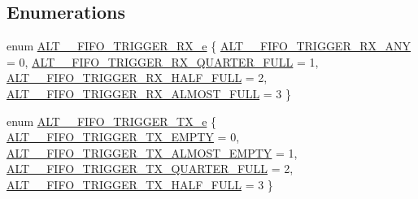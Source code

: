 \subsection*{Enumerations}
\begin{DoxyCompactItemize}
\item 
enum \mbox{\hyperlink{group__UART__FIFO_ga2bfcdb68fa8def11f82daafbdab9b32c}{A\+L\+T\+\_\+\_\+\+F\+I\+F\+O\+\_\+\+T\+R\+I\+G\+G\+E\+R\+\_\+\+R\+X\+\_\+e}} \{ \mbox{\hyperlink{group__UART__FIFO_gga2bfcdb68fa8def11f82daafbdab9b32cae4a6c3354a0b441adf2cea823435f773}{A\+L\+T\+\_\+\_\+\+F\+I\+F\+O\+\_\+\+T\+R\+I\+G\+G\+E\+R\+\_\+\+R\+X\+\_\+\+A\+NY}} = 0, 
\mbox{\hyperlink{group__UART__FIFO_gga2bfcdb68fa8def11f82daafbdab9b32cabc651af853aff38557f940cec59567db}{A\+L\+T\+\_\+\_\+\+F\+I\+F\+O\+\_\+\+T\+R\+I\+G\+G\+E\+R\+\_\+\+R\+X\+\_\+\+Q\+U\+A\+R\+T\+E\+R\+\_\+\+F\+U\+LL}} = 1, 
\mbox{\hyperlink{group__UART__FIFO_gga2bfcdb68fa8def11f82daafbdab9b32cacf50fd41d90f61f744ede4a4893a3ffc}{A\+L\+T\+\_\+\_\+\+F\+I\+F\+O\+\_\+\+T\+R\+I\+G\+G\+E\+R\+\_\+\+R\+X\+\_\+\+H\+A\+L\+F\+\_\+\+F\+U\+LL}} = 2, 
\mbox{\hyperlink{group__UART__FIFO_gga2bfcdb68fa8def11f82daafbdab9b32cabbb66ab848534e0202166eefb17d28cd}{A\+L\+T\+\_\+\_\+\+F\+I\+F\+O\+\_\+\+T\+R\+I\+G\+G\+E\+R\+\_\+\+R\+X\+\_\+\+A\+L\+M\+O\+S\+T\+\_\+\+F\+U\+LL}} = 3
 \}
\item 
enum \mbox{\hyperlink{group__UART__FIFO_gaeef8e1e6b4ec8b82200067bf4ba2e04e}{A\+L\+T\+\_\+\_\+\+F\+I\+F\+O\+\_\+\+T\+R\+I\+G\+G\+E\+R\+\_\+\+T\+X\+\_\+e}} \{ \mbox{\hyperlink{group__UART__FIFO_ggaeef8e1e6b4ec8b82200067bf4ba2e04eaf8a3f395cce5a8c01e68e8a099439f4e}{A\+L\+T\+\_\+\_\+\+F\+I\+F\+O\+\_\+\+T\+R\+I\+G\+G\+E\+R\+\_\+\+T\+X\+\_\+\+E\+M\+P\+TY}} = 0, 
\mbox{\hyperlink{group__UART__FIFO_ggaeef8e1e6b4ec8b82200067bf4ba2e04ead6f5e3102b439100e3d36e49a47c50c0}{A\+L\+T\+\_\+\_\+\+F\+I\+F\+O\+\_\+\+T\+R\+I\+G\+G\+E\+R\+\_\+\+T\+X\+\_\+\+A\+L\+M\+O\+S\+T\+\_\+\+E\+M\+P\+TY}} = 1, 
\mbox{\hyperlink{group__UART__FIFO_ggaeef8e1e6b4ec8b82200067bf4ba2e04ea8c67b558095a8854011cb866996d2f40}{A\+L\+T\+\_\+\_\+\+F\+I\+F\+O\+\_\+\+T\+R\+I\+G\+G\+E\+R\+\_\+\+T\+X\+\_\+\+Q\+U\+A\+R\+T\+E\+R\+\_\+\+F\+U\+LL}} = 2, 
\mbox{\hyperlink{group__UART__FIFO_ggaeef8e1e6b4ec8b82200067bf4ba2e04eaa7a95884e49b3ba2772b48aa5f5bea37}{A\+L\+T\+\_\+\_\+\+F\+I\+F\+O\+\_\+\+T\+R\+I\+G\+G\+E\+R\+\_\+\+T\+X\+\_\+\+H\+A\+L\+F\+\_\+\+F\+U\+LL}} = 3
 \}
\end{DoxyCompactItemize}
